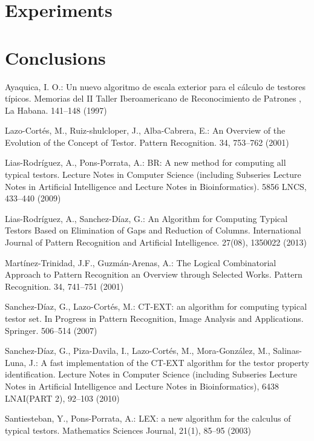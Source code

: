 \documentclass[citeauthoryear]{llncs}
\begin{document}
\section{Experiments}
%
%
\section{Conclusions}
%
%
\begin{thebibliography}{}
%


	Ayaquica, I. O.:
	Un nuevo algoritmo de escala exterior para el c\'alculo de testores t\'ipicos.
	Memorias del II Taller Iberoamericano de Reconocimiento de Patrones , La
	Habana. 141--148 (1997)

	Lazo-Cort\'es, M., Ruiz-shulcloper, J., Alba-Cabrera, E.:
	An Overview of the Evolution of the Concept of Testor. 
	Pattern Recognition. 34, 753--762 (2001)

	Lias-Rodr\'iguez, A., Pons-Porrata, A.:
	BR: A new method for computing all typical testors. 
	Lecture Notes in Computer Science (including Subseries Lecture Notes 
	in Artificial Intelligence and Lecture Notes in Bioinformatics).
	5856 LNCS, 433--440 (2009)

	Lias-Rodr\'iguez, A., Sanchez-D\'iaz, G.:
 	An Algorithm for Computing Typical Testors Based on Elimination of Gaps and Reduction of Columns.
 	International Journal of Pattern Recognition and Artificial Intelligence. 27(08), 1350022 (2013)

	Mart\'inez-Trinidad, J.F., Guzm\'an-Arenas, A.: 
	The Logical Combinatorial Approach to Pattern Recognition an Overview through Selected Works. 
	Pattern Recognition. 34, 741--751 (2001)

	Sanchez-D\'iaz, G., Lazo-Cort\'es, M.:
	CT-EXT: an algorithm for computing typical testor set. 
	In Progress in Pattern Recognition, Image Analysis and Applications. Springer. 506--514 (2007)

	Sanchez-D\'iaz, G., Piza-Davila, I., Lazo-Cort\'es, M., Mora-Gonz\'alez, M., Salinas-Luna, J.:
	A fast implementation of the CT-EXT algorithm for the testor property identification. 
	Lecture Notes in Computer Science (including Subseries Lecture Notes in Artificial Intelligence and 
	Lecture	Notes in Bioinformatics), 6438 LNAI(PART 2), 92--103 (2010)

	Santiesteban, Y., Pons-Porrata, A.:
	LEX: a new algorithm for the calculus of typical testors. 
	Mathematics Sciences Journal, 21(1), 85--95 (2003)


\end{thebibliography}
\end{document}
